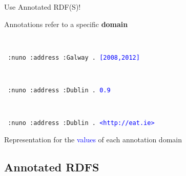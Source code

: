  
\begin{frame}{Use Annotated RDF(S)!}

  \begin{center}
    Annotations refer to a specific \alert{\textbf{domain}}
  \end{center}
  \pause
  {\color{green}{Temporal:}}\\[-.6em]
  \begin{block}{}
    {\small\tt
      :nuno :address :Galway . \textcolor{blue}{[2008,2012]}
    }
  \end{block}
  \pause

  {\color{green}{Fuzzy:}}\\[-.6em]
  \begin{block}{}
    {\small\tt
      :nuno :address :Dublin . \textcolor{blue}{0.9}
    }
  \end{block}

  \pause

  {\color{green}{Provenance:}}\\[-.5em]
  \begin{block}{}
    {\small\tt
      :nuno :address :Dublin . \textcolor{blue}{<http://eat.ie>}
    }
  \end{block}

  \pause
  \begin{center}
    Representation for the \textcolor{blue}{values} of each \alert{annotation domain}
  \end{center}

  
\end{frame}



\subsection{Annotated RDFS}





